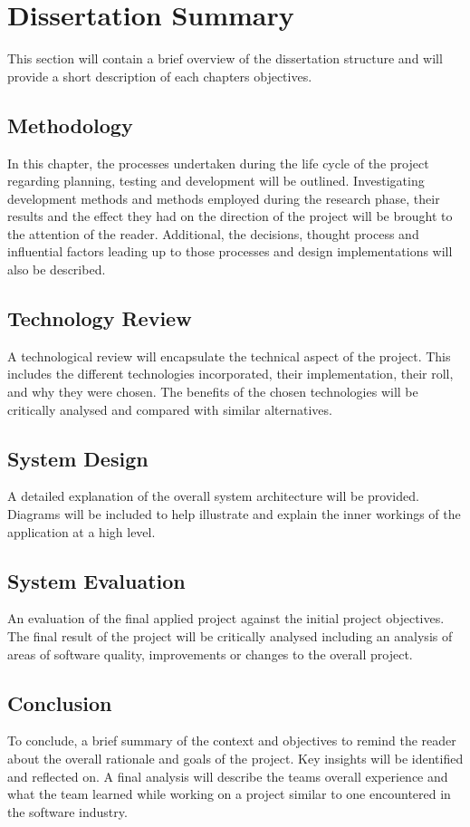 \section{Dissertation Summary}
This section will contain a brief overview of the dissertation structure and will provide a short description of each chapters objectives.

\subsection{Methodology}
In this chapter, the processes undertaken during the life cycle of the project regarding planning, testing and development will be outlined. Investigating development methods and methods employed during the research phase, their results and the effect they had on the direction of the project will be brought to the attention of the reader. Additional, the decisions, thought process and influential factors leading up to those processes and design implementations will also be described.

\subsection{Technology Review}
A technological review will encapsulate the technical aspect of the project. This includes the different technologies incorporated, their implementation, their roll, and why they were chosen. The benefits of the chosen technologies will be critically analysed and compared with similar alternatives.

\subsection{System Design}
A detailed explanation of the overall system architecture will be provided. Diagrams will be included to help illustrate and explain the inner workings of the application at a high level.

\subsection{System Evaluation}
An evaluation of the final applied project against the initial project objectives. The final result of the project will be critically analysed including an analysis of areas of software quality, improvements or changes to the overall project.

\subsection{Conclusion}
To conclude, a brief summary of the context and objectives to remind the reader about the overall rationale and goals of the project. Key insights will be identified and reflected on. A final analysis will describe the teams overall experience and what the team learned while working on a project similar to one encountered in the software industry.


